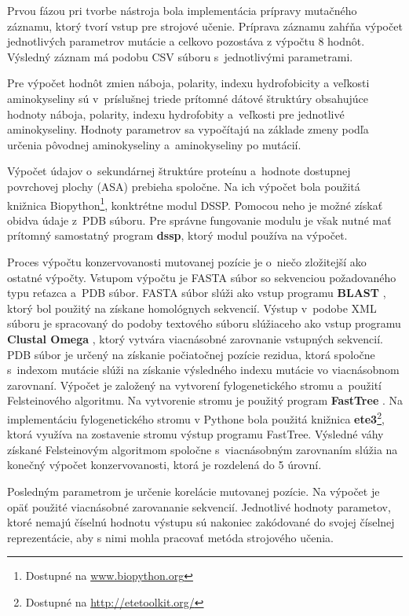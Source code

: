 Prvou fázou pri tvorbe nástroja bola implementácia prípravy mutačného záznamu, ktorý tvorí vstup pre strojové učenie. Príprava záznamu zahŕňa výpočet jednotlivých parametrov mutácie a celkovo pozostáva z výpočtu 8 hodnôt. Výsledný záznam má podobu CSV súboru s~jednotlivými parametrami.

Pre výpočet hodnôt zmien náboja, polarity, indexu hydrofobicity a veľkosti aminokyseliny sú v~príslušnej triede prítomné dátové štruktúry obsahujúce hodnoty náboja, polarity, indexu hydrofobity a~veľkosti pre jednotlivé aminokyseliny. Hodnoty parametrov sa vypočítajú na základe zmeny podľa určenia pôvodnej aminokyseliny a~aminokyseliny po mutácií.

Výpočet údajov o~sekundárnej štruktúre proteínu a~hodnote dostupnej povrchovej plochy (ASA) prebieha spoločne. Na ich výpočet bola použitá knižnica Biopython\footnote{Dostupné na \url{www.biopython.org}}, konktrétne modul DSSP. Pomocou neho je možné získať obidva údaje z~PDB súboru. Pre správne fungovanie modulu je však nutné mať prítomný samostatný program \textbf{dssp}, ktorý modul používa na výpočet.

Proces výpočtu konzervovanosti mutovanej pozície je o~niečo zložitejší ako ostatné výpočty. Vstupom výpočtu je FASTA súbor so sekvenciou požadovaného typu reťazca a~PDB súbor. FASTA súbor slúži ako vstup programu \textbf{BLAST} \cite{blastp}, ktorý bol použitý na získane homológnych sekvencií. Výstup v~podobe XML súboru je spracovaný do podoby textového súboru slúžiaceho ako vstup programu \textbf{Clustal Omega} \cite{clustal}, ktorý vytvára viacnásobné zarovnanie vstupných sekvencií.
PDB súbor je určený na získanie počiatočnej pozície rezidua, ktorá spoločne s~indexom mutácie slúži na získanie výsledného indexu mutácie vo viacnásobnom zarovnaní. Výpočet je založený na vytvorení fylogenetického stromu a~použití Felsteinového algoritmu. Na vytvorenie stromu je použitý program \textbf{FastTree} \cite{fasttree}. Na implementáciu fylogenetického stromu v Pythone bola použitá knižnica \textbf{ete3}\footnote{Dostupné na \url{http://etetoolkit.org/}}, ktorá využíva na zostavenie stromu výstup programu FastTree. Výsledné váhy získané Felsteinovým algoritmom spoločne s~viacnásobným zarovnaním slúžia na konečný výpočet konzervovanosti, ktorá je rozdelená do 5 úrovní.

Posledným parametrom je určenie korelácie mutovanej pozície. Na výpočet je opäť použité viacnásobné zarovananie sekvencií. Jednotlivé hodnoty parametov, ktoré nemajú číselnú hodnotu výstupu sú nakoniec zakódované do svojej číselnej reprezentácie, aby s nimi mohla pracovať metóda strojového učenia.

